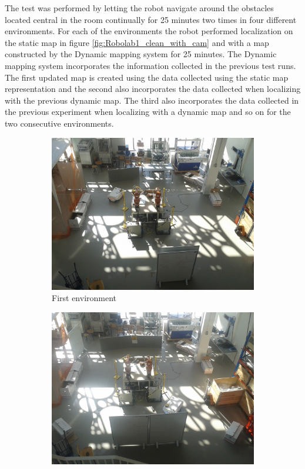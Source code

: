 The test was performed by letting the robot navigate around the obstacles located central in the room continually for 25 minutes two times in four different environments. 
For each of the environments the robot performed localization on the static map in figure \ref{fig:Robolab1_clean_with_cam} and with a map constructed by the Dynamic mapping system for 25 minutes. 
The Dynamic mapping system incorporates the information collected in the previous test runs.
The first updated map is created using the data collected using the static map representation and the second also incorporates the data collected when localizing with the previous dynamic map. 
The third also incorporates the data collected in the previous experiment when localizing with a dynamic map and so on for the two consecutive environments.

\begin{figure}[htbp]
	\begin{subfigure}[t]{0.499\textwidth}	
		\centering	
		\includegraphics[width=1\textwidth]{chapters/evaluation/figures/mayhem_robolab1}
		\caption{First environment}
		\label{fig:location_environment1}
	\end{subfigure}
	\begin{subfigure}[t]{0.499\textwidth}
		\centering
		\includegraphics[width=1\textwidth]{chapters/evaluation/figures/mayhem_robolab2}

\end{subfigure}
\end{figure}
